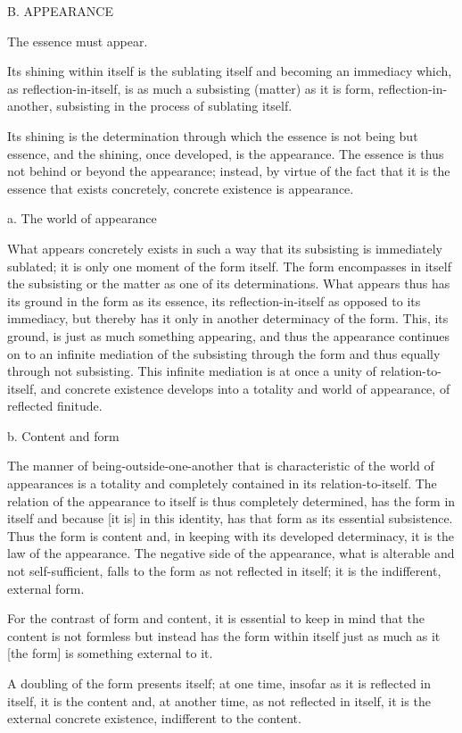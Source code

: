 B. APPEARANCE

The essence must appear.

Its shining within itself is
the sublating itself and
becoming an immediacy which,
as reflection-in-itself, is
as much a subsisting (matter)
as it is form, reflection-in-another,
subsisting in the process of sublating itself.

Its shining is the determination through which
the essence is not being but essence,
and the shining, once developed, is the appearance.
The essence is thus not behind or beyond the appearance;
instead, by virtue of the fact that it is
the essence that exists concretely,
concrete existence is appearance.

a. The world of appearance

What appears concretely exists in such a way
that its subsisting is immediately sublated;
it is only one moment of the form itself.
The form encompasses in itself the subsisting
or the matter as one of its determinations.
What appears thus has its ground in the form
as its essence, its reflection-in-itself
as opposed to its immediacy, but thereby has it
only in another determinacy of the form.
This, its ground, is just as much something appearing,
and thus the appearance continues on to an infinite mediation
of the subsisting through the form
and thus equally through not subsisting.
This infinite mediation is at once
a unity of relation-to-itself,
and concrete existence develops into a totality
and world of appearance, of reflected finitude.

b. Content and form

The manner of being-outside-one-another that is
characteristic of the world of appearances is
a totality and completely contained in its relation-to-itself.
The relation of the appearance to itself is
thus completely determined, has the form in itself
and because [it is] in this identity,
has that form as its essential subsistence.
Thus the form is content and,
in keeping with its developed determinacy,
it is the law of the appearance.
The negative side of the appearance,
what is alterable and not self-sufficient,
falls to the form as not reflected in itself;
it is the indifferent, external form.

    For the contrast of form and content,
    it is essential to keep in mind that
    the content is not formless but
    instead has the form within itself
    just as much as it [the form] is
    something external to it.

    A doubling of the form presents itself;
    at one time,
    insofar as it is reflected in itself,
    it is the content and,
    at another time,
    as not reflected in itself,
    it is the external concrete existence,
    indifferent to the content.

